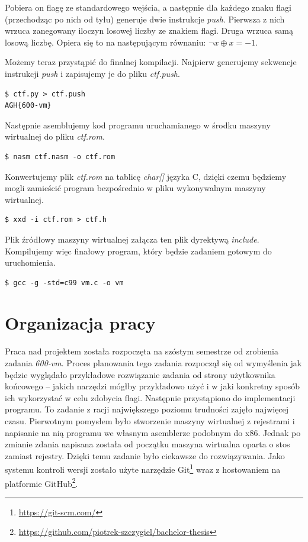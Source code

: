 \documentclass[language=polish,type=eng]{aghmodern}
\begin{document}
Pobiera on flagę ze standardowego wejścia, a następnie dla każdego znaku flagi
(przechodząc po nich od tyłu) generuje dwie instrukcje \emph{push}.
Pierwsza z nich wrzuca zanegowany iloczyn losowej liczby ze znakiem flagi.
Druga wrzuca samą losową liczbę. Opiera się to na następującym równaniu:
\( \neg x \oplus x = -1 \).

Możemy teraz przystąpić do finalnej kompilacji. Najpierw generujemy sekwencje
instrukcji \emph{push} i zapisujemy je do pliku \emph{ctf.push}.

\begin{verbatim}
$ ctf.py > ctf.push
AGH{600-vm}
\end{verbatim}

Następnie asemblujemy kod programu uruchamianego w środku maszyny wirtualnej
do pliku \emph{ctf.rom}.

\begin{verbatim}
$ nasm ctf.nasm -o ctf.rom
\end{verbatim}

Konwertujemy plik \emph{ctf.rom} na tablicę \emph{char[]} języka C, dzięki czemu
będziemy mogli zamieścić program bezpośrednio w pliku wykonywalnym maszyny
wirtualnej.

\begin{verbatim}
$ xxd -i ctf.rom > ctf.h
\end{verbatim}

Plik źródłowy maszyny wirtualnej załącza ten plik dyrektywą \emph{include}.
Kompilujemy więc finałowy program, który będzie zadaniem gotowym do uruchomienia.

\begin{verbatim}
$ gcc -g -std=c99 vm.c -o vm
\end{verbatim}

\chapter{Organizacja pracy}

Praca nad projektem została rozpoczęta na szóstym semestrze od zrobienia zadania \emph{600-vm}.
Proces planowania tego zadania rozpoczął się od wymyślenia jak będzie wyglądało
przykładowe rozwiązanie zadania od strony użytkownika
końcowego -- jakich narzędzi mógłby przykładowo użyć i w jaki konkretny sposób ich wykorzystać
w celu zdobycia flagi. Następnie przystąpiono do implementacji programu.
To zadanie z racji największego poziomu trudności zajęło
najwięcej czasu. Pierwotnym pomysłem było stworzenie maszyny wirtualnej z rejestrami
i napisanie na nią programu we własnym asemblerze podobnym do x86. Jednak po zmianie zdania
napisana została od początku maszyna wirtualna oparta o stos zamiast rejestry.
Dzięki temu zadanie było ciekawsze do rozwiązywania.
Jako systemu kontroli wersji zostało użyte narzędzie
Git\footnote{\url{https://git-scm.com/}} wraz z hostowaniem na platformie GitHub\footnote{
\url{https://github.com/piotrek-szczygiel/bachelor-thesis}}.
\end{document}
